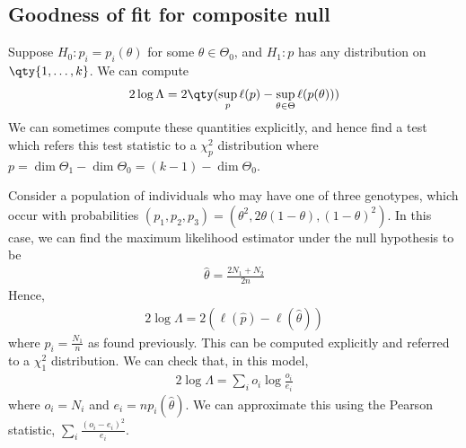 \subsection{Goodness of fit for composite null}
Suppose $H_0 \colon p_i = p_i(\theta)$ for some $\theta \in \Theta_0$, and $H_1 \colon p$ has any distribution on $\qty{1, \dots, k}$.
We can compute
\begin{align*}
	2 \log \Lambda = 2 \qty( \sup_p \ell(p) - \sup_{\theta \in \Theta} \ell(p(\theta)) )
\end{align*}
We can sometimes compute these quantities explicitly, and hence find a test which refers this test statistic to a $\chi^2_p$ distribution where $p = \dim \Theta_1 - \dim \Theta_0 = (k-1) - \dim \Theta_0$.
\begin{example}
	Consider a population of individuals who may have one of three genotypes, which occur with probabilities $(p_1, p_2, p_3) = (\theta^2, 2\theta(1-\theta), (1-\theta)^2)$.
	In this case, we can find the maximum likelihood estimator under the null hypothesis to be
	\begin{align*}
		\hat \theta = \frac{2N_1 + N_2}{2n}
	\end{align*}
	Hence,
	\begin{align*}
		2 \log \Lambda = 2(\ell(\hat p) - \ell(\hat \theta))
	\end{align*}
	where $\hat p_i = \frac{N_1}{n}$ as found previously.
	This can be computed explicitly and referred to a $\chi^2_1$ distribution.
	We can check that, in this model,
	\begin{align*}
		2 \log \Lambda = \sum_i o_i \log \frac{o_i}{e_i}
	\end{align*}
	where $o_i = N_i$ and $e_i = n p_i(\hat \theta)$.
	We can approximate this using the Pearson statistic, $\sum_i \frac{(o_i - e_i)^2}{e_i}$.
\end{example}

